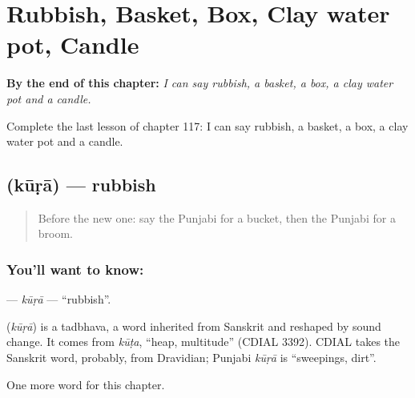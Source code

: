 
\chapter{Rubbish, Basket, Box, Clay water pot, Candle}
\label{ch:pa-rubbish-basket-box-clay-water-pot-candle}

\begin{chapteropening}
\textbf{By the end of this chapter:} \emph{I can say rubbish, a basket, a box, a clay water pot and a candle.}

Complete the last lesson of chapter 117: I can say rubbish, a basket, a box, a clay water pot and a candle.
\end{chapteropening}

\section[\texorpdfstring{\pa{ਕੂੜਾ} (kūṛā)}{ਕੂੜਾ (kūṛā)}]{ (kūṛā) — rubbish}

\label{lesson:PA-C117-kura}



\begin{quote}
Before the new one: say the Punjabi for a bucket, then the Punjabi for a broom.
\end{quote}

\subsection*{You'll want to know: }
\textbf{} — \emph{kūṛā} — \textquotedblleft{}rubbish\textquotedblright{}.

\begin{cousinweb}
\textbf{} (\emph{kūṛā}) is a tadbhava, a word inherited from Sanskrit and reshaped by sound change. It comes from \emph{kūṭa}, \textquotedblleft{}heap, multitude\textquotedblright{} (CDIAL 3392). CDIAL takes the Sanskrit word, probably, from Dravidian; Punjabi \emph{kūṛā} is \textquotedblleft{}sweepings, dirt\textquotedblright{}.
\end{cousinweb}

\begin{grammarlens}[title={What you've built}]
One more word for this chapter.
\end{grammarlens}

